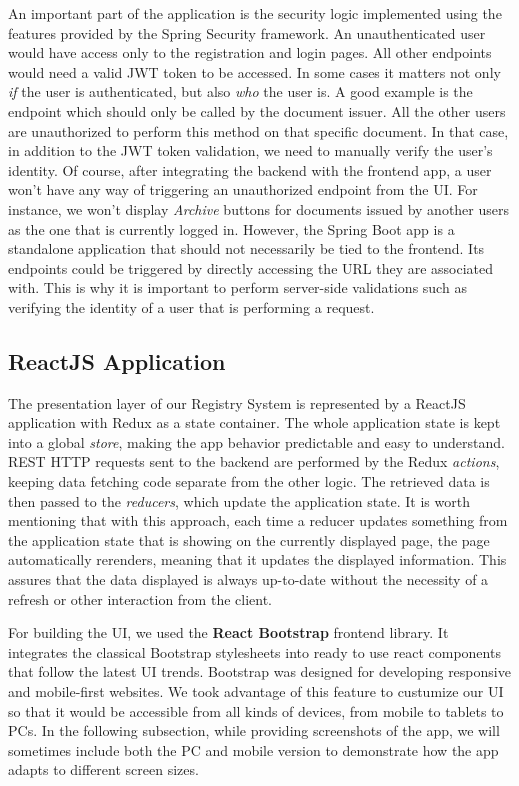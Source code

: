 An important part of the application is the security logic implemented using the features provided by the Spring Security framework. An unauthenticated user would have access only to the registration and login pages. All other endpoints would need a valid JWT token to be accessed. In some cases it matters not only \textit{if} the user is authenticated, but also \textit{who} the user is. A good example is the  endpoint which should only be called by the document issuer. All the other users are unauthorized to perform this method on that specific document. In that case, in addition to the JWT token validation, we need to manually verify the user's identity. Of course, after integrating the backend with the frontend app, a user won't have any way of triggering an unauthorized endpoint from the UI. For instance, we won't display \textit{Archive} buttons for documents issued by another users as the one that is currently logged in. However, the Spring Boot app is a standalone application that should not necessarily be tied to the frontend. Its endpoints could be triggered by directly accessing the URL they are associated with. This is why it is important to perform server-side validations such as verifying the identity of a user that is performing a request.



\subsection{ReactJS Application}
\label{subsection:reactJsApplication}

The presentation layer of our Registry System is represented by a ReactJS application with Redux as a state container. The whole application state is kept into a global \textit{store}, making the app behavior predictable and easy to understand. REST HTTP requests sent to the backend are performed by the Redux \textit{actions}, keeping data fetching code separate from the other logic. The retrieved data is then passed to the \textit{reducers}, which update the application state. It is worth mentioning that with this approach, each time a reducer updates something from the application state that is showing on the currently displayed page, the page automatically rerenders, meaning that it updates the displayed information. This assures that the data displayed is always up-to-date without the necessity of a refresh or other interaction from the client.

For building the UI, we used the \textbf{React Bootstrap} frontend library. It integrates the classical Bootstrap stylesheets into ready to use react components that follow the latest UI trends. Bootstrap was designed for developing responsive and mobile-first websites. We took advantage of this feature to custumize our UI so that it would be accessible from all kinds of devices, from mobile to tablets to PCs. In the following subsection, while providing screenshots of the app, we will sometimes include both the PC and mobile version to demonstrate how the app adapts to different screen sizes.



